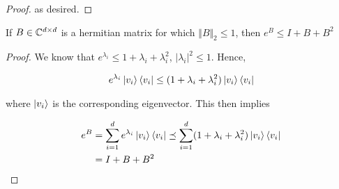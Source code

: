 \documentclass[main.tex]{subfiles}
\begin{document}
\begin{subappendices}
\begin{theorem}
\begin{proof}
as desired.
\end{proof}
\end{theorem}

\begin{lemma}
\label{lemma:exp-eigen-approx}
If $B \in \mathbb{C}^{d \times d}$ is a hermitian matrix for which $\Vert B \Vert_2 \leq 1$, then $e^{B} \leq I + B + B^2$

\begin{proof}
	We know that $e^{\lambda_i} \leq 1 + \lambda_i + \lambda_i^2$, $|\lambda_i|^2 \leq 1$. Hence,
	
	\begin{align*}
	e^{\lambda_i} \ket{v_i}\bra{v_i} \leq (1 + \lambda_i + \lambda_i^2) 	\ket{v_i}\bra{v_i}
	\end{align*}

	where $\ket{v_i}$ is the corresponding eigenvector. This then implies
	
	\begin{align*}
	e^B &= \sum_{i=1}^d e^{\lambda_i} \ket{v_i}\bra{v_i} \preceq \sum_{i=1}^d (1 + \lambda_i + \lambda_i^2) \ket{v_i}\bra{v_i} \\
	&= I + B + B^2
	\end{align*}
\end{proof}
\end{lemma}

\end{subappendices}
\end{document}
